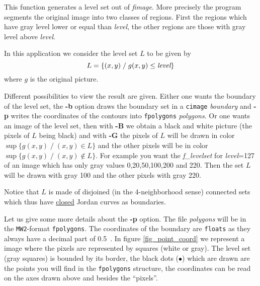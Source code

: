 This function generates a level set out of {\em fimage}. More precisely
the program segments the original image into two classes of regions.
First the regions which have gray level lower or equal than {\em level},
the other regions are those with gray level above {\em level}.

In this application we consider the level set $L$ to be given by
$$ L=\{(x,y) \;/\; g(x,y)\leq \mbox{\em level} \}$$
where $g$ is the original picture.

Different possibilities to view the result are given. Either one wants 
the boundary of the level set, the {\bf -b} option draws the boundary set
in a {\tt cimage} {\em boundary} and {\bf -p} writes the coordinates of the
contours into {\tt fpolygons} {\em polygons}. Or one wants an image 
of the level set, then with {\bf -B} we obtain a black and white picture
(the pixels of $L$ being black) and with {\bf -G} the pixels of $L$ will
be drawn in color $\sup\{g(x,y)\;/\; (x,y)\in L\}$ and the other pixels
will be in color $\sup\{g(x,y)\;/\; (x,y)\not\in L\}$. For example you
want the {\em f\_levelset} for {\em level}=127 of an image which has only
gray values 0,20,50,100,200 and 220. Then the set $L$ will be drawn with
gray 100 and the other pixels with gray 220. 

Notice that $L$ is made of
disjoined (in the 4-neighborhood sense) connected sets 
which thus have \underline{closed} Jordan curves as boundaries. 

Let us give some more details about the {\bf -p} option. The file {\em polygons}
will be in the {\tt MW2}-format {\tt fpolygons}. The coordinates of the
boundary are {\tt floats} as they always have a decimal part of 0.5\ .
In figure \ref{fig_point_coord} we represent a image where
the pixels are represented by squares (white or gray). The level set 
(gray squares) is bounded by its border, the black dots ($\bullet$) which are
drawn are the points  you will find in the {\tt fpolygons} structure,
the coordinates can be read on the axes drawn above and besides the ``pixels''.


